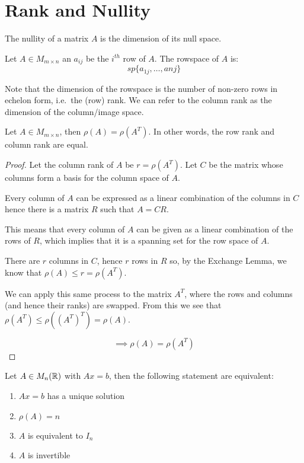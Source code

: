 \documentclass[a4paper,10pt]{article}
\begin{document}
\section{Rank and Nullity}

\begin{defn}[Nullity]
	The nullity of a matrix $A$ is the dimension of its null space.
\end{defn}

\begin{defn}[Rowspace]
	Let $A \in M_{m \times n}$ an $a_{ij}$ be the $i^{th}$ row of $A$.
	The rowspace of $A$ is:
	\[
		sp \{ a_{1j}, \ldots, a{nj} \}
	\]
\end{defn}

Note that the dimension of the rowspace is the number of non-zero rows
in echelon form, i.e.\ the (row) rank. We can refer to the column rank as
the dimension of the column/image space.

\begin{thm}
	Let $A \in M_{m \times n}$, then $\rho(A) = \rho(A^T)$. In other
	words, the row rank and column rank are equal.
\end{thm}

\begin{proof}
	Let the column rank of $A$ be $r = \rho(A^T)$. Let $C$ be the
	matrix whose columns form a basis for the column space of $A$.

	Every column of $A$ can be expressed as a linear combination of
	the columns in $C$ hence there is a matrix $R$ such that
	$A = CR$.

	This means that every column of $A$ can be given as a linear
	combination of the rows of $R$, which implies that it is a
	spanning set for the row space of $A$.

	There are $r$ columns in $C$, hence $r$ rows in $R$ so, by the
	Exchange Lemma, we know that $\rho(A) \leq r = \rho(A^T)$.

	We can apply this same process to the matrix $A^T$, where the
	rows and columns (and hence their ranks) are swapped. From this
	we see that $\rho(A^T) \leq \rho({(A^T)}^T) = \rho(A)$.

	\[
		\implies \rho(A) = \rho(A^T)
	\]
\end{proof}

\begin{thm}
	Let $A \in M_n(\mathbb{R})$ with $Ax = b$, then the following statement
	are equivalent:
	\begin{enumerate}
		\item
			$Ax = b$ has a unique solution
		\item
			$\rho(A) = n$
		\item
			$A$ is equivalent to $I_n$
		\item
			$A$ is invertible
	\end{enumerate}
\end{thm}
\end{document}
